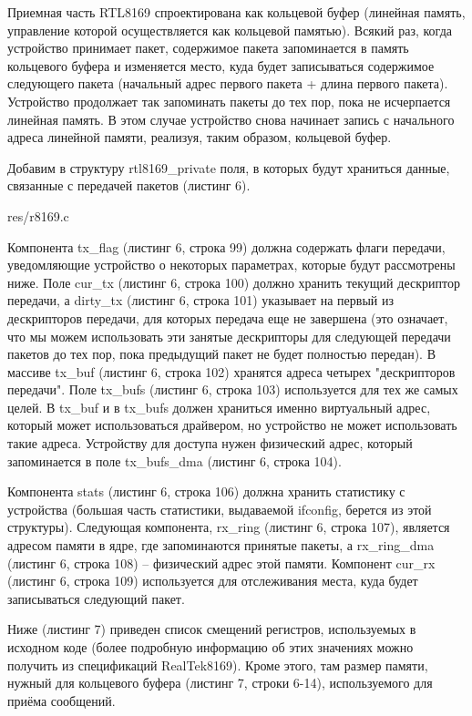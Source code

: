 Приемная часть RTL8169 спроектирована как кольцевой буфер (линейная память, управление которой осуществляется как кольцевой памятью). Всякий раз, когда устройство принимает пакет, содержимое пакета запоминается в память кольцевого буфера и изменяется место, куда будет записываться содержимое следующего пакета (начальный адрес первого пакета + длина первого пакета). Устройство продолжает так запоминать пакеты до тех пор, пока не исчерпается линейная память. В этом случае устройство снова начинает запись с начального адреса линейной памяти, реализуя, таким образом, кольцевой буфер.

Добавим в структуру rtl8169\_private поля, в которых будут храниться данные, связанные с передачей пакетов (листинг 6).


{res/r8169.c}

Компонента tx\_flag (листинг 6, строка 99) должна содержать флаги передачи, уведомляющие устройство о некоторых параметрах, которые будут рассмотрены ниже. Поле cur\_tx (листинг 6, строка 100) должно хранить текущий дескриптор передачи, а dirty\_tx (листинг 6, строка 101) указывает на первый из дескрипторов передачи, для которых передача еще не завершена (это означает, что мы можем использовать эти занятые дескрипторы для следующей передачи пакетов до тех пор, пока предыдущий пакет не будет полностью передан). В массиве tx\_buf (листинг 6, строка 102) хранятся адреса четырех "дескрипторов передачи". Поле tx\_bufs (листинг 6, строка 103) используется для тех же самых целей. В tx\_buf и в tx\_bufs должен храниться именно виртуальный адрес, который может использоваться драйвером, но устройство не может использовать такие адреса. Устройству для доступа нужен физический адрес, который запоминается в поле tx\_bufs\_dma (листинг 6, строка 104).

Компонента stats (листинг 6, строка 106) должна хранить статистику с устройства (большая часть статистики, выдаваемой ifconfig, берется из этой структуры). Следующая компонента, rx\_ring (листинг 6, строка 107), является адресом памяти в ядре, где запоминаются принятые пакеты, а rx\_ring\_dma (листинг 6, строка 108) -- физический адрес этой памяти. Компонент cur\_rx (листинг 6, строка 109) используется для отслеживания места, куда будет записываться следующий пакет.

Ниже (листинг 7) приведен список смещений регистров, используемых в исходном коде (более подробную информацию об этих значениях можно получить из спецификаций RealTek8169). Кроме этого, там размер памяти, нужный для кольцевого буфера (листинг 7, строки 6-14), используемого для приёма сообщений.

